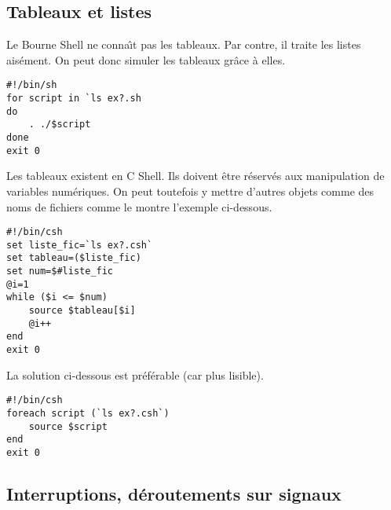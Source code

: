 \subsection{Tableaux et listes}

Le Bourne Shell ne conna{\^\i}t pas les tableaux. Par contre, il traite les listes ais{\'e}ment. On 
peut donc simuler les tableaux gr{\^a}ce {\`a} elles.

\begin{example}
\begin{verbatim}
#!/bin/sh
for script in `ls ex?.sh
do
    . ./$script
done
exit 0
\end{verbatim}
\end{example}

Les tableaux existent en C Shell. Ils doivent {\^e}tre r{\'e}serv{\'e}s aux manipulation de variables 
num{\'e}riques. On peut toutefois y mettre d'autres objets comme des noms de fichiers comme le 
montre l'exemple ci-dessous.

\begin{example}
\begin{verbatim}
#!/bin/csh
set liste_fic=`ls ex?.csh`
set tableau=($liste_fic)
set num=$#liste_fic
@i=1
while ($i <= $num)
    source $tableau[$i]
    @i++
end
exit 0
\end{verbatim}

La solution ci-dessous est pr{\'e}f{\'e}rable (car plus lisible).

\begin{verbatim}
#!/bin/csh
foreach script (`ls ex?.csh`)
    source $script
end
exit 0
\end{verbatim}
\end{example}

\subsection{Interruptions, d{\'e}routements sur signaux}


